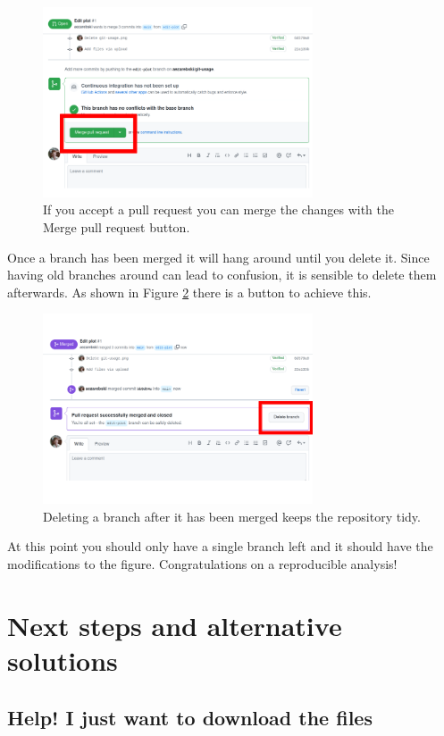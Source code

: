 \documentclass[11pt,onecolumn]{scrartcl}
\begin{document}
\begin{figure}[htbp]
\centering
\includegraphics[width=8cm]{./merge-pull-request.png}
\caption{\label{fig:merge-pull-request}If you accept a pull request you can merge the changes with the Merge pull request button.}
\end{figure}

Once a branch has been merged it will hang around until you delete it. Since
having old branches around can lead to confusion, it is sensible to delete them
afterwards. As shown in Figure \ref{fig:delete-branch} there is a button to achieve
this.

\begin{figure}[htbp]
\centering
\includegraphics[width=8cm]{./delete-branch.png}
\caption{\label{fig:delete-branch}Deleting a branch after it has been merged keeps the repository tidy.}
\end{figure}

At this point you should only have a single branch left and it should have the
modifications to the figure. Congratulations on a reproducible analysis!

\section{Next steps and alternative solutions}
\label{sec:orga3aa16d}

\subsection{Help! I just want to download the files}
\label{sec:orgd722708}
\end{document}
